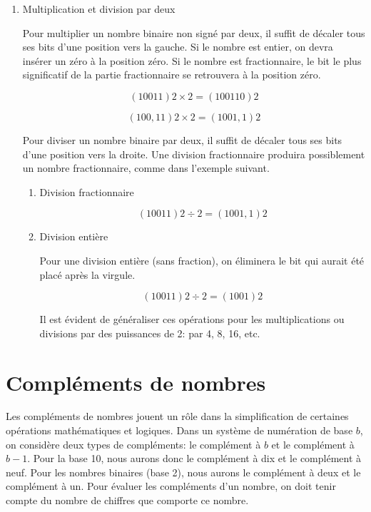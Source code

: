 \documentclass[letter, oneside]{book}
\begin{document}
\begin{enumerate}
\item Multiplication et division par deux
\label{sec:orgf24cb62}

Pour multiplier un nombre binaire non signé par deux, il suffit de
décaler tous ses bits d'une position vers la gauche. Si le nombre est
entier, on devra insérer un zéro à la position zéro. Si le nombre est
fractionnaire, le bit le plus significatif de la partie fractionnaire se
retrouvera à la position zéro.

$$(10011)2 \times 2 = (100110)2$$

$$(100,11)2 \times 2 = (1001,1)2$$

Pour diviser un nombre binaire par deux, il suffit de décaler tous ses
bits d'une position vers la droite. Une division fractionnaire
produira possiblement un nombre fractionnaire, comme dans l'exemple
suivant.

\begin{enumerate}
\item Division fractionnaire
\label{sec:orga63f985}

$$(10011)2 \div 2 = (1001,1)2$$

\item Division entière
\label{sec:org130f55d}

Pour une division entière (sans fraction), on éliminera le bit qui
aurait été placé après la virgule.

$$(10011)2 \div 2 = (1001)2$$

Il est évident de généraliser ces opérations pour les multiplications
ou divisions par des puissances de 2: par 4, 8, 16, etc.
\end{enumerate}
\end{enumerate}

\section{Compléments de nombres}
\label{sec:org171b8f5}

Les compléments de nombres jouent un rôle dans la simplification de
certaines opérations mathématiques et logiques. Dans un système de
numération de base \(b\), on considère deux types de compléments: le
complément à \(b\) et le complément à \(b-1\). Pour la base 10, nous
aurons donc le complément à dix et le complément à neuf. Pour les
nombres binaires (base 2), nous aurons le complément à deux et le
complément à un.  Pour évaluer les compléments d'un nombre, on doit
tenir compte du nombre de chiffres que comporte ce nombre.
\end{document}
